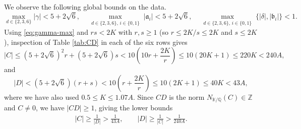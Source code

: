 \documentclass[11pt,a4paper]{article}
\numberwithin{equation}{section}
\numberwithin{table}{section}
\numberwithin{figure}{section}
\begin{document}
\medskip

We observe the following global bounds on the data.
\begin{equation}\label{eq:gamma-max}
	\max_{d\in\{2,3,6\}}|\gamma| < 5+2\sqrt{6},\quad
	\max_{\substack{d\in \{2,3,6\},\,i\in\{0,1\}}}|\mathfrak{a}_i| < 5+2\sqrt{6},\quad
	\max_{\substack{d\in \{2,3,6\},\,i\in\{0,1\}}}\{|\delta|,|\mathfrak{b}_i|\} < 1.
\end{equation}
Using \eqref{eq:gamma-max} and $rs<2K$ with $r,s\geq 1$
(so $r\leq 2K/s\leq 2K$ and $s\leq 2K$), inspection of Table \ref{tab:CD} in each of the six rows gives
\begin{equation}\label{eq:C-upper}
	|C| \leq (5+2\sqrt{6})^2 r+(5+2\sqrt{6})s
	< 10\left(10r+\frac{2K}{r}\right)
	\leq 10(20K+1) \leq 220K < 240A,
\end{equation}
and
\begin{equation}\label{eq:D-upper}
	|D| < (5+2\sqrt{6})(r+s)
	< 10\left(r+\frac{2K}{r}\right)
	\leq 10(2K+1) \leq 40K < 43A,
\end{equation}
where we have also used $0.5 \le K \le 1.07A$. Since $CD$ is the norm $N_{\mathbb{K}/\mathbb{Q}}(C) \in \mathbb{Z}$ and
$C \neq 0$, we have $|CD| \geq 1$, giving the lower bounds
\begin{align*}
	|C| \geq \frac{1}{|D|} > \frac{1}{43A}, \qquad
	|D| \geq \frac{1}{|C|} > \frac{1}{240A}.
\end{align*}

\medskip
\end{document}
